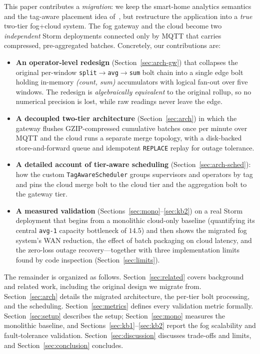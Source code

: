 \documentclass[conference]{IEEEtran}
\newcommand{\code}[1]{\texttt{#1}}
\begin{document}
This paper contributes a \emph{migration}: we keep the smart-home analytics
semantics and the tag-aware placement idea of~\cite{pham2021}, but restructure
the application into a \emph{true} two-tier fog+cloud system. The fog gateway and
the cloud become two \emph{independent} Storm deployments connected only by MQTT
that carries compressed, pre-aggregated batches. Concretely, our contributions
are:

\begin{itemize}
\item \textbf{An operator-level redesign} (Section~\ref{sec:arch-gw}) that
  collapses the original per-window \code{split}$\to$\code{avg}$\to$\code{sum}
  bolt chain into a single edge bolt holding in-memory \emph{(count, sum)}
  accumulators with logical fan-out over five windows. The redesign is
  \emph{algebraically equivalent} to the original rollup, so no numerical
  precision is lost, while raw readings never leave the edge.
\item \textbf{A decoupled two-tier architecture} (Section~\ref{sec:arch}) in
  which the gateway flushes GZIP-compressed cumulative batches once per minute
  over MQTT and the cloud runs a separate merge topology, with a disk-backed
  store-and-forward queue and idempotent \code{REPLACE} replay for outage
  tolerance.
\item \textbf{A detailed account of tier-aware scheduling}
  (Section~\ref{sec:arch-sched}): how the custom \code{TagAwareScheduler} groups
  supervisors and operators by tag and pins the cloud merge bolt to the cloud
  tier and the aggregation bolt to the gateway tier.
\item \textbf{A measured validation} (Sections~\ref{sec:mono}--\ref{sec:kb2}) on a
  real Storm deployment that begins from a monolithic cloud-only baseline
  (quantifying its central \code{avg-1} capacity bottleneck of $14.5$) and then
  shows the migrated fog system's WAN reduction, the effect of batch packaging on
  cloud latency, and the zero-loss outage recovery---together with three
  implementation limits found by code inspection (Section~\ref{sec:limits}).
\end{itemize}

The remainder is organized as follows. Section~\ref{sec:related} covers
background and related work, including the original design we migrate from.
Section~\ref{sec:arch} details the migrated architecture, the per-tier bolt
processing, and the scheduling. Section~\ref{sec:metrics} defines every validation
metric formally. Section~\ref{sec:setup} describes the setup;
Section~\ref{sec:mono} measures the monolithic baseline, and
Sections~\ref{sec:kb1}--\ref{sec:kb2} report the fog scalability and
fault-tolerance validation.
Section~\ref{sec:discussion} discusses trade-offs and limits, and
Section~\ref{sec:conclusion} concludes.
\end{document}
